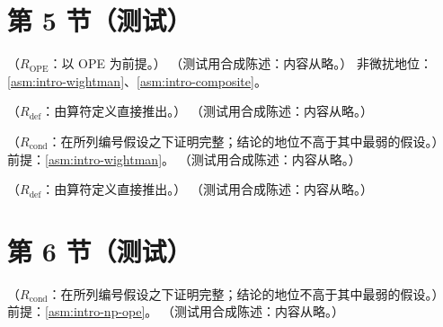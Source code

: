 \section{第 5 节（测试）}\label{sec:dis-moments}

\begin{proposition}\label{prop:dis-ope-rg}
（$R_{\mathrm{OPE}}$：以 OPE 为前提。）
（测试用合成陈述：内容从略。）
非微扰地位：\cref{asm:intro-wightman}、\cref{asm:intro-composite}。
\end{proposition}

\begin{lemma}\label{lem:dis-euclid-segment}
（$R_{\mathrm{def}}$：由算符定义直接推出。）
（测试用合成陈述：内容从略。）
\end{lemma}

\begin{proposition}\label{prop:dis-dispersion-np}
（$R_{\mathrm{cond}}$：在所列编号假设之下证明完整；结论的地位不高于其中最弱的假设。）
前提：\cref{asm:intro-wightman}。
（测试用合成陈述：内容从略。）
\end{proposition}

\begin{proposition}\label{prop:dis-low-moments}
（$R_{\mathrm{def}}$：由算符定义直接推出。）
（测试用合成陈述：内容从略。）
\end{proposition}

\section{第 6 节（测试）}\label{sec:dis-rg}

\begin{lemma}\label{lem:dis-ope-segment}
（$R_{\mathrm{cond}}$：在所列编号假设之下证明完整；结论的地位不高于其中最弱的假设。）
前提：\cref{asm:intro-np-ope}。
（测试用合成陈述：内容从略。）
\end{lemma}

